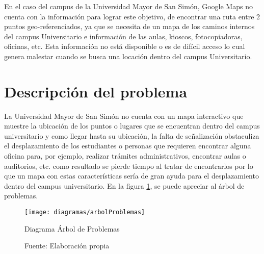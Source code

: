   En el caso del campus de la Universidad Mayor de San Simón, Google Maps no cuenta con la información para lograr este objetivo, de encontrar una ruta entre 2 puntos geo-referenciados, ya que se necesita de un mapa de los caminos internos del campus Universitario e información de las aulas, kioscos, fotocopiadoras, oficinas, etc. Esta información no está disponible o es de difícil acceso lo cual genera malestar cuando se busca una locación dentro del campus Universitario.

  \section{Descripción del problema} %
  \label{sec:desc_probl}


  La Universidad Mayor de San Simón no cuenta con un mapa interactivo que
  muestre la ubicación de los puntos o lugares que se encuentran dentro del
  campus universitario y como llegar hasta su ubicación, la falta de señalización obstaculiza el desplazamiento de los estudiantes o personas que requieren encontrar alguna oficina para, por ejemplo, realizar trámites administrativos, encontrar aulas o auditorios, etc. como resultado se pierde tiempo al tratar de encontrarlos por lo que un mapa con estas características sería de gran ayuda para el desplazamiento dentro del campus universitario. En la figura  \ref{fig:arbolProblemas}, se puede apreciar al árbol de problemas.



  \begin{figure}[!ht]
    \begin{center}
      \texttt{[image: diagramas/arbolProblemas]}
    \end{center}
    \caption{Diagrama Árbol de Problemas}
    \label{fig:arbolProblemas}
    \caption*{Fuente: Elaboración propia}
  \end{figure}

